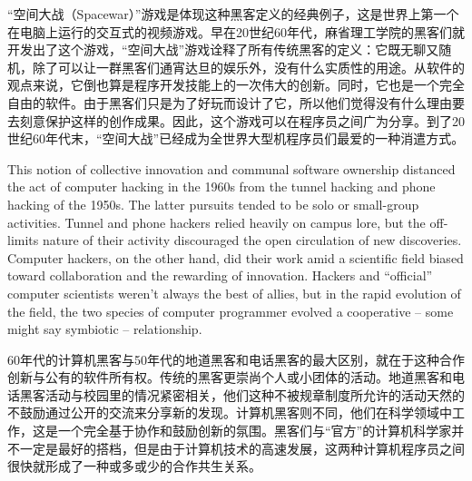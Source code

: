 \ifdefined\chs
``空间大战（Spacewar）''游戏是体现这种黑客定义的经典例子，这是世界上第一个在电脑上运行的交互式的视频游戏。早在20世纪60年代，麻省理工学院的黑客们就开发出了这个游戏，``空间大战''游戏诠释了所有传统黑客的定义：它既无聊又随机，除了可以让一群黑客们通宵达旦的娱乐外，没有什么实质性的用途。从软件的观点来说，它倒也算是程序开发技能上的一次伟大的创新。同时，它也是一个完全自由的软件。由于黑客们只是为了好玩而设计了它，所以他们觉得没有什么理由要去刻意保护这样的创作成果。因此，这个游戏可以在程序员之间广为分享。到了20世纪60年代末，``空间大战''已经成为全世界大型机程序员们最爱的一种消遣方式。
\fi

\ifdefined\eng
This notion of collective innovation and communal software ownership distanced the act of computer hacking in the 1960s from the tunnel hacking and phone hacking of the 1950s. The latter pursuits tended to be solo or small-group activities. Tunnel and phone hackers relied heavily on campus lore, but the off-limits nature of their activity discouraged the open circulation of new discoveries. Computer hackers, on the other hand, did their work amid a scientific field biased toward collaboration and the rewarding of innovation. Hackers and ``official'' computer scientists weren't always the best of allies, but in the rapid evolution of the field, the two species of computer programmer evolved a cooperative -- some might say symbiotic -- relationship.
\fi

\ifdefined\chs
60年代的计算机黑客与50年代的地道黑客和电话黑客的最大区别，就在于这种合作创新与公有的软件所有权。传统的黑客更崇尚个人或小团体的活动。地道黑客和电话黑客活动与校园里的情况紧密相关，他们这种不被规章制度所允许的活动天然的不鼓励通过公开的交流来分享新的发现。计算机黑客则不同，他们在科学领域中工作，这是一个完全基于协作和鼓励创新的氛围。黑客们与``官方''的计算机科学家并不一定是最好的搭档，但是由于计算机技术的高速发展，这两种计算机程序员之间很快就形成了一种或多或少的合作共生关系。
\fi


